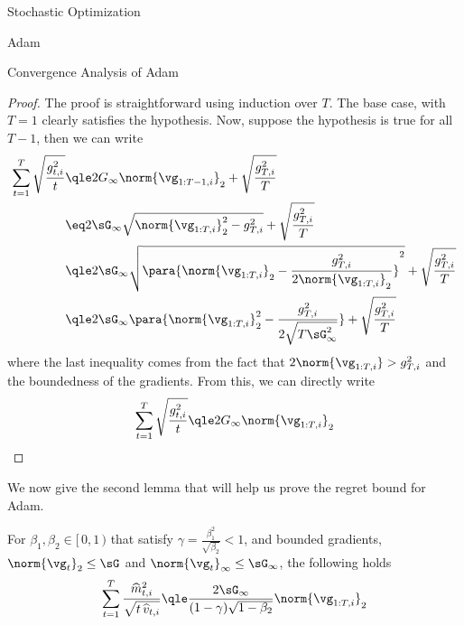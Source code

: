 \documentclass{article}
\begin{document}
\begin{psection}{Stochastic Optimization}
\begin{psubsection}{Adam}
\begin{pssubsection}{Convergence Analysis of Adam}
\begin{lemma}
				\begin{proof}
					The proof is straightforward using induction over $T$. The base case, with $T = 1$ clearly satisfies the hypothesis. Now, suppose the hypothesis is true for all $T - 1$, then we can write
					\begin{align*}
						\sum_{t = 1}^T \sqrt{\frac{g_{t, i}^2}{t}}	&\qle	2 G_{\infty} \norm{\vg_{1:T-1, i}}_2 + \sqrt{\frac{g_{T, i}^2}{T}} \\
						&\eq	2 \sG_{\infty} \sqrt{\norm{\vg_{1:T, i}}_2^2 - g_{T, i}^2} + \sqrt{\frac{g_{T, i}^2}{T}} \\
						&\qle	2 \sG_{\infty} \sqrt{\para{\norm{\vg_{1:T, i}}_2 - \frac{g_{T, i}^2}{2 \norm{\vg_{1:T, i}}_2}}^2} + \sqrt{\frac{g_{T, i}^2}{T}} \\
						&\qle	2 \sG_{\infty} \para{\norm{\vg_{1:T, i}}_2^2 - \frac{g_{T, i}^2}{2 \sqrt{T \sG_{\infty}^2}}} + \sqrt{\frac{g_{T, i}^2}{T}}
					\end{align*}
					where the last inequality comes from the fact that $2\norm{\vg_{1:T, i}} > g_{T,i}^2$ and the boundedness of the gradients. From this, we can directly write
					\begin{align*}
						\sum_{t = 1}^T \sqrt{\frac{g_{t, i}^2}{t}} \qle 2 G_{\infty} \norm{\vg_{1:T, i}}_2
					\end{align*}
				\end{proof}
				\label{lem:adam-lem1}
			\end{lemma}

			We now give the second lemma that will help us prove the regret bound for Adam.

			\begin{lemma}
				For $\beta_1, \beta_2 \in [\,0, 1\,)$ that satisfy $\gamma = \frac{\beta_1^2}{\sqrt{\beta_2}} < 1$, and bounded gradients, \ie \\ $\norm{\vg_t}_2 \le \sG$ and $\norm{\vg_t}_\infty \le \sG_{\infty}$, the following holds
				\begin{align*}
					\sum_{t = 1}^T \frac{\widehat{m}_{t, i}^2}{\displaystyle \sqrt{t \, \widehat{v}_{t, i}}} \qle \frac{2 \sG_{\infty}}{(1 - \gamma) \sqrt{1 - \beta_2}} \norm{\vg_{1:T, i}}_2
				\end{align*}


\end{lemma}
\end{pssubsection}
\end{psubsection}
\end{psection}
\end{document}
